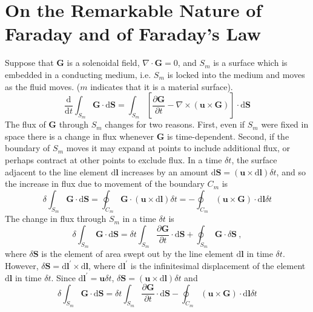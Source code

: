 \documentclass[12pt,a4paper]{article}
\renewcommand{\vec}[1]{\boldsymbol{#1}}
\newcommand{\dif}{\mathrm{d}}
\begin{document}
\section{On the Remarkable Nature of Faraday and of Faraday's Law}
Suppose that $\vec{G}$ is a solenoidal field, $\nabla \cdot \vec{G} = 0$, and $S_m$ is a surface which is embedded in a conducting medium, i.e. $S_m$ is locked into the medium and moves as the fluid moves. ($m$ indicates that it is a material surface). 
\begin{equation}
\frac{\dif }{\dif t} \int_{S_m} \vec{G} \cdot \dif \vec{S} = \int_{S_m} \left[\frac{\partial \vec{G}}{\partial t} - \nabla \times (\vec{u}\times \vec{G})\right] \cdot \dif \vec{S}
\end{equation}
The flux of $\vec{G}$ through $S_m$ changes for two reasons. First, even if $S_m$ were fixed in space there is a change in flux whenever $\vec{G}$ is time-dependent. Second, if the boundary of $S_m$ moves it may expand at points to include additional flux, or perhaps contract at other points to exclude flux. In a time $\delta t$, the surface adjacent to the line element $\dif \vec{l}$ increases by an amount $\dif \vec{S} = (\vec{u}\times \dif \vec{l}) \delta t$, and so the increase in flux due to movement of the boundary $C_m$ is
\begin{equation*}
\delta \int_{S_m} \vec{G} \cdot \dif \vec{S} = \oint_{C_m} \vec{G} \cdot (\vec{u}\times \dif \vec{l}) \delta t = -\oint_{C_m} (\vec{u}\times \vec{G}) \cdot  \dif \vec{l} \delta t
\end{equation*}
The change in flux through $S_m$ in a time $\delta t$ is
\begin{equation*}
\delta \int_{S_m} \vec{G} \cdot \dif \vec{S} = \delta t \int_{S_m} \frac{\partial \vec{G}}{\partial t} \cdot \dif \vec{S} +\oint_{S_m} \vec{G} \cdot \delta \vec{S} ~,
\end{equation*}
where $\delta \vec{S}$ is the element of area swept out by the line element $\dif \vec{l}$ in time $\delta t$. However, $\delta \vec{S} = \dif \vec{l}^\prime \times \dif \vec{l}$, where $\dif \vec{l}^\prime$ is the infinitesimal displacement of the element $\dif \vec{l}$ in time $\delta t$. Since $\dif \vec{l}^\prime = \vec{u} \delta t$, $\delta \vec{S} = (\vec{u} \times \dif \vec{l}) \delta t$ and 
\begin{equation*}
\delta \int_{S_m} \vec{G} \cdot \dif \vec{S} = \delta t \int_{S_m} \frac{\partial \vec{G}}{\partial t} \cdot \dif \vec{S} -\oint_{C_m} (\vec{u}\times \vec{G}) \cdot  \dif \vec{l} \delta t
\end{equation*}
\end{document}
